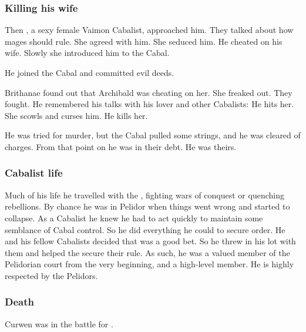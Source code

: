 \subsubsection{Killing his wife}
Then , a sexy female Vaimon Cabalist, approached him. 
They talked about how mages should rule. 
She agreed with him. 
She seduced him. 
He cheated on his wife. 
Slowly she introduced him to the Cabal. 

He joined the Cabal and committed evil deeds.

Brithanae found out that Archibald was cheating on her. 
She freaked out. 
They fought. 
He remembered his talks with his lover and other Cabalists: 
He hits her. 
She scowls and curses him. 
He kills her. 

He was tried for murder, but the Cabal pulled some strings, and he was cleared of charges. 
From that point on he was in their debt. 
He was theirs. 





\subsubsection{Cabalist life}
Much of his life he travelled with the \Velcadian{} \ishrah{}, fighting wars of conquest or quenching rebellions. 
By chance he was in Pelidor when things went wrong and \GreatVelcad started to collapse. 
As a Cabalist he knew he had to act quickly to maintain some semblance of Cabal control. 
So he did everything he could to secure order. 
He and his fellow Cabalists decided that  was a good bet. 
So he threw in his lot with them and helped the \rayuths secure their rule. 
As such, he was a valued member of the Pelidorian court from the very beginning, and a high-level \ishrah{} member. 
He is highly respected by the Pelidors. 





\subsubsection{Death}
Curwen was  in the battle for \Forclin. 









